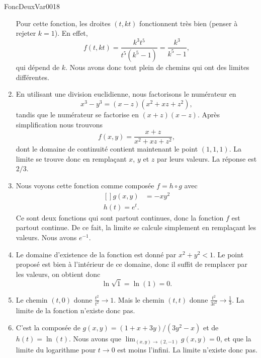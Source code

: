 \begin{corrige}{FoncDeuxVar0018}
\begin{enumerate}
			Pour cette fonction, les droites $(t,kt)$ fonctionnent très bien (penser à rejeter $k=1$). En effet,
			\begin{equation}
				f(t,kt)=\frac{ k^3t^5 }{ t^5(k^5-1) }=\frac{ k^3 }{ k^5-1 },
			\end{equation}
			qui dépend de $k$. Nous avons donc tout plein de chemins qui ont des limites différentes.
		\item	%
			En utilisant une division euclidienne, nous factorisons le numérateur en
			\begin{equation}
				x^3-y^3=(x-z)(x^2+xz+z^2),
			\end{equation}
			tandis que le numérateur se factorise en $(x+z)(x-z)$. Après simplification nous trouvons
			\begin{equation}
				f(x,y)=\frac{ x+z }{ x^2+xz+z^2 },
			\end{equation}
			dont le domaine de continuité contient maintenant le point $(1,1,1)$. La limite se trouve donc en remplaçant $x$, $y$ et $z$ par leurs valeurs. La réponse est $2/3$.
		\item	%
			Nous voyons cette fonction comme composée $f=h\circ g$ avec
			\begin{equation}
				\begin{aligned}[]
					g(x,y)&=-xy^2\\
					h(t)= e^{t}.
				\end{aligned}
			\end{equation}
			Ce sont deux fonctions qui sont partout continues, donc la fonction $f$ est partout continue. De ce fait, la limite se calcule simplement en remplaçant les valeurs. Nous avons $ e^{-1}$.
		\item	%
			Le domaine d'existence de la fonction est donné par $x^2+y^2<1$. Le point proposé est bien à l'intérieur de ce domaine, donc il suffit de remplacer par les valeurs, on obtient donc
			\begin{equation}
				\ln\sqrt{1}=\ln(1)=0.
			\end{equation}
		\item	%
			Le chemin $(t,0)$ donne $\frac{ t^2 }{ t^2 }\to 1$. Mais le chemin $(t,t)$ donne $\frac{ t^2 }{ 3t^2 }\to \frac{1}{ 3 }$. La limite de la fonction n'existe donc pas.
		\item	%
			C'est la composée de $g(x,y)=(1+x+3y)/(3y^2-x)$ et de $h(t)=\ln(t)$. Nous avons que $\lim_{(x,y)\to(2,-1)}g(x,y)=0$, et que la limite du logarithme pour $t\to 0$ est moins l'infini. La limite n'existe donc pas.


\end{enumerate}
\end{corrige}
